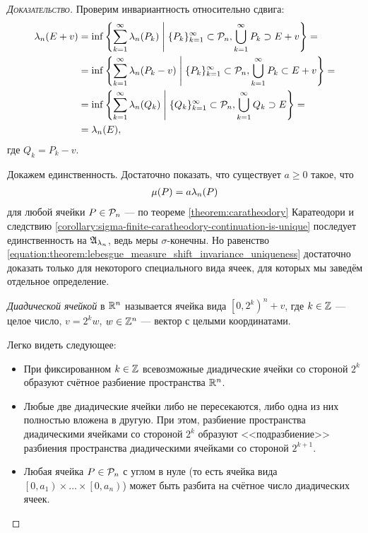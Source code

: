 \begin{proof}[\normalfont\textsc{Доказательство}]
 Проверим инвариантность относительно сдвига:
  \begin{align*}
   \lambda_n(E+v) &= \inf \left\{ \sum_{k=1}^{\infty} \lambda_n(P_k) \;\middle|\; \{P_{k}\}_{k=1}^{\infty} \subset \mathcal{P}_n, \bigcup_{k=1}^{\infty} P_k \supset E + v  \right\} = \\
   &= \inf \left\{ \sum_{k=1}^{\infty} \lambda_n(P_k - v) \;\middle|\; \{P_{k}\}_{k=1}^{\infty}  \subset \mathcal{P}_n, \bigcup_{k=1}^{\infty} P_k \subset E+v \right\} = \\
   &= \inf \left\{ \sum_{k=1}^{\infty} \lambda_n(Q_k) \;\middle|\; \{Q_{k}\}_{k=1}^{\infty} \subset \mathcal{P}_n, \bigcup_{k=1}^{\infty} Q_k \supset E   \right\} = \\
   &= \lambda_n(E)
 ,\end{align*} где $Q_k = P_k - v$.

 Докажем единственность. Достаточно показать, что существует $a \geqslant 0$ такое, что \begin{align}
  \label{equation:theorem:lebesgue_measure_shift_invariance_uniqueness}
  \mu(P) = a \lambda_n(P) 
 \end{align} для любой ячейки $P \in \mathcal{P}_n$ --- по теореме \ref{theorem:caratheodory} Каратеодори и следствию \ref{corollary:sigma-finite-caratheodory-continuation-is-unique} последует единственность на $\mathfrak{A}_{\lambda_n}$, ведь меры $\sigma$-конечны. Но равенство \eqref{equation:theorem:lebesgue_measure_shift_invariance_uniqueness} достаточно доказать только для некоторого специального вида ячеек, для которых мы заведём отдельное определение. 
 \begin{df}
  \label{definition:diadic_cell}
  \textit{Диадической ячейкой} в $\mathbb{R}^{n}$  называется ячейка вида $\left[0, 2^{k}\right)^{n} + v$, где $k \in \mathbb{Z}$ --- целое число, $v = 2^{k}w$, $w \in \mathbb{Z}^{n}$ --- вектор с целыми координатами.
 \end{df}

 Легко видеть следующее:
 \begin{itemize}
  \item При фиксированном $k \in \mathbb{Z}$ всевозможные диадические ячейки со стороной $2^{k}$ образуют счётное разбиение пространства $\mathbb{R}^{n}$. 
  \item Любые две диадические ячейки либо не пересекаются, либо одна из них полностью вложена в другую. При этом, разбиение пространства диадическими  ячейками со стороной $2^{k}$ образуют <<подразбиение>> разбиения пространства диадическими ячейками со стороной $2^{k+1}$.
  \item Любая ячейка $P \in \mathcal{P}_n$ с углом в нуле (то есть ячейка вида $\left[0, a_1\right) \times \ldots \times \left[0, a_n\right)$) может быть разбита на счётное число диадических ячеек.


\end{itemize}
\end{proof}

